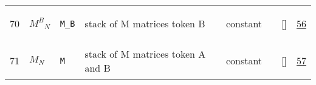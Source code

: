 \begin{longtable}{|p{1cm}|p{3cm}|p{3cm}|p{7cm}|p{3.0cm}|p{3cm}|p{2cm}|p{1cm}|}
    70
             & \hypertarget{"v:70"}{ $ {{M^{B}}}{_{N}} $}
             & \verb|M_B|
             & stack of M matrices token B
             & \begin{lay}constant \end{lay}
             & $  $
             & []
             & \hyperlink{"e:56"}{ 56 }
                 \\
    71
             & \hypertarget{"v:71"}{ $ {M}{_{N}} $}
             & \verb|M|
             & stack of M matrices token A and B
             & \begin{lay}constant \end{lay}
             & $  $
             & []
             & \hyperlink{"e:57"}{ 57 }
                 \\
    \end{longtable}